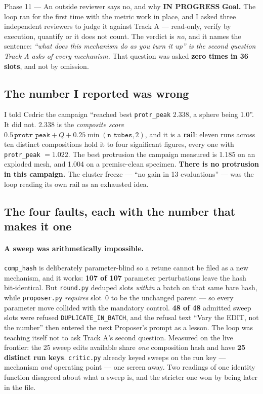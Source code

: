 \documentclass[11pt,a4paper]{article}
\newcommand{\code}[1]{\texttt{#1}}
\newcommand{\prog}{\textcolor{warn}{\textbf{IN PROGRESS}}}
\begin{document}
\begin{phasebox}{Phase 11 --- An outside reviewer says no, and why \hfill \prog}
\textbf{Goal.} The loop ran for the first time with the metric work in place, and I asked three
independent reviewers to judge it against Track A --- read-only, verify by execution, quantify or
it does not count. The verdict is \emph{no}, and it names the sentence: \emph{``what does this
mechanism do as you turn it up'' is the second question Track A asks of every mechanism.} That
question was asked \textbf{zero times in 36 slots}, and not by omission.

\subsection*{The number I reported was wrong}
I told Cedric the campaign ``reached best \code{protr\_peak} 2.338, a sphere being 1.0''. It did
not. 2.338 is the \emph{composite score} $0.5\,\code{protr\_peak} + Q + 0.25\min(\code{n\_tubes},2)$,
and it is a \textbf{rail}: eleven runs across ten distinct compositions hold it to four significant
figures, every one with \code{protr\_peak} $=1.022$. The best protrusion the campaign measured is
1.185 on an exploded mesh, and 1.004 on a premise-clean specimen. \textbf{There is no protrusion in
this campaign.} The cluster freeze --- ``no gain in 13 evaluations'' --- was the loop reading its
own rail as an exhausted idea.

\subsection*{The four faults, each with the number that makes it one}

\paragraph{A sweep was arithmetically impossible.} \code{comp\_hash} is deliberately
parameter-blind so a retune cannot be filed as a new mechanism, and it works: \textbf{107 of 107}
parameter perturbations leave the hash bit-identical. But \code{round.py} deduped slots
\emph{within} a batch on that same bare hash, while \code{proposer.py} \emph{requires} slot~0 to be
the unchanged parent --- so every parameter move collided with the mandatory control.
\textbf{48 of 48} admitted sweep slots were refused \code{DUPLICATE\_IN\_BATCH}, and the refusal
text ``Vary the EDIT, not the number'' then entered the next Proposer's prompt as a lesson. The
loop was teaching itself not to ask Track A's second question. Measured on the live frontier: the
25 sweep edits available share \emph{one} composition hash and have \textbf{25 distinct run keys}.
\code{critic.py} already keyed sweeps on the run key --- mechanism \emph{and} operating point ---
one screen away. Two readings of one identity function disagreed about what a sweep is, and the
stricter one won by being later in the file.


\end{phasebox}
\end{document}
